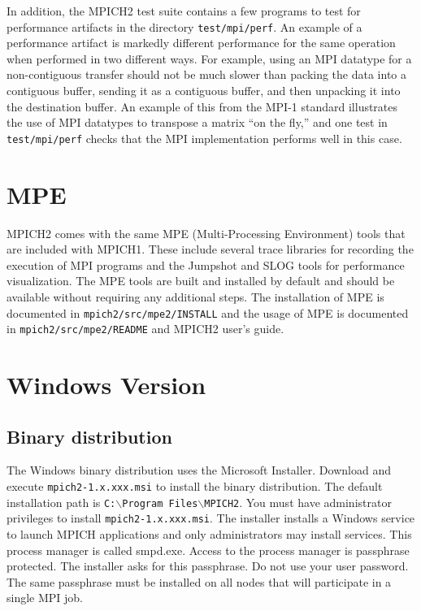 \documentclass[dvipdfm,11pt]{article}
\begin{document}
In addition, the
MPICH2 test suite contains a few programs to test for performance artifacts in
the directory \texttt{test/mpi/perf}.  An example of a performance artifact is
markedly different performance for the same operation when performed in two
different ways.  For example, using an MPI datatype for a non-contiguous
transfer should not be much slower than packing the data into a contiguous
buffer, sending it as a contiguous buffer, and then unpacking it into the
destination buffer.  An example of this from the MPI-1 standard illustrates
the use of MPI datatypes to transpose a matrix ``on the fly,'' and one test in
\texttt{test/mpi/perf} checks that the MPI implementation performs well in
this case.

\section{MPE}
\label{sec:mpe}

MPICH2 comes with the same MPE (Multi-Processing Environment) tools that are
included with MPICH1.  These include several trace libraries for recording the
execution of MPI programs and the Jumpshot and SLOG tools for performance
visualization.  The MPE tools are built and installed by default and should be
available without requiring any additional steps.  The installation of MPE
is documented in \texttt{mpich2/src/mpe2/INSTALL} and the usage of MPE is
documented in \texttt{mpich2/src/mpe2/README} and MPICH2 user's guide.

\section{Windows Version}
\label{sec:windows}

\subsection{Binary distribution}
\label{sec:winbin}

The Windows binary distribution uses the Microsoft Installer.  Download and 
execute \texttt{mpich2-1.x.xxx.msi} to install the binary distribution.  The default 
installation path is \texttt{C:$\backslash$Program Files$\backslash$MPICH2}. 
You must have administrator privileges to install
\texttt{mpich2-1.x.xxx.msi}.  The installer  
installs a Windows service to launch MPICH applications and only administrators
may install services.  This process manager is called smpd.exe.  Access to 
the process manager is passphrase protected.  The installer asks for this 
passphrase.  Do not use your user password.  The same passphrase must be 
installed on all nodes that will participate in a single MPI job.
\end{document}
